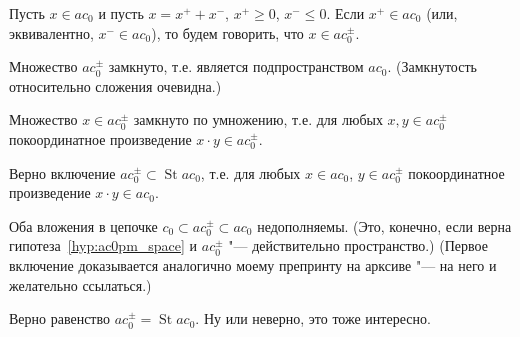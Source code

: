 \begin{definition}
	Пусть $x\in ac_0$ и пусть $x = x^+ +x^-$, $x^+\geq 0$, $x^- \leq 0$.
	Если $x^+ \in ac_0$ (или, эквивалентно, $x^- \in ac_0$),
	то будем говорить, что $x\in ac_0^\pm$.
\end{definition}

\begin{hypothesis}
	\label{hyp:ac0pm_space}
	Множество $ac_0^\pm$ замкнуто, т.е. является подпространством $ac_0$.
	(Замкнутость относительно сложения очевидна.)
\end{hypothesis}

\begin{hypothesis}
	Множество $x\in ac_0^\pm$ замкнуто по умножению, т.е. для любых $x, y\in ac_0^\pm$
	покоординатное произведение $x\cdot y \in ac_0^\pm$.
\end{hypothesis}


\begin{hypothesis}
	Верно включение $ac_0^\pm \subset \operatorname{St} ac_0$, т.е. для любых $x \in ac_0$, $y\in ac_0^\pm$
	покоординатное произведение $x\cdot y \in ac_0$.
\end{hypothesis}

\begin{hypothesis}
	Оба вложения в цепочке $c_0 \subset ac_0^\pm \subset ac_0$ недополняемы.
	(Это, конечно, если верна гипотеза~\ref{hyp:ac0pm_space} и $ac_0^\pm$ "--- действительно пространство.)
	(Первое включение доказывается аналогично моему препринту на арксиве "--- на него и желательно ссылаться.)
\end{hypothesis}


\begin{hypothesis}
	Верно равенство $ac_0^\pm = \operatorname{St} ac_0$.
	Ну или неверно, это тоже интересно.
\end{hypothesis}

